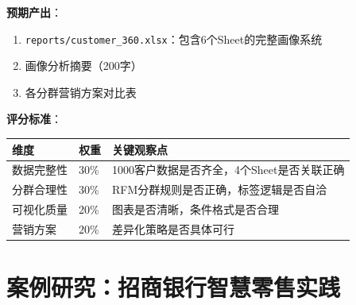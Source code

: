\begin{exercisebox}
\textbf{预期产出}：
\begin{enumerate}[leftmargin=2em]
  \item \texttt{reports/customer\_360.xlsx}：包含6个Sheet的完整画像系统
  \item 画像分析摘要（200字）
  \item 各分群营销方案对比表
\end{enumerate}

\textbf{评分标准}：
\begin{table}[H]
\centering
\begin{tabular}{lp{2cm}p{7cm}}
\toprule
\textbf{维度} & \textbf{权重} & \textbf{关键观察点} \\
\midrule
数据完整性 & 30\% & 1000客户数据是否齐全，4个Sheet是否关联正确 \\
分群合理性 & 30\% & RFM分群规则是否正确，标签逻辑是否自洽 \\
可视化质量 & 20\% & 图表是否清晰，条件格式是否合理 \\
营销方案 & 20\% & 差异化策略是否具体可行 \\
\bottomrule
\end{tabular}
\end{table}
\end{exercisebox}

\section{案例研究：招商银行智慧零售实践}

